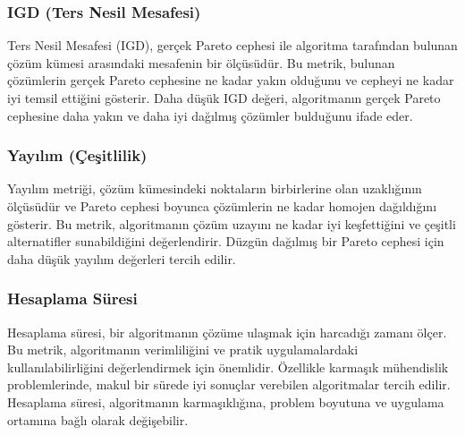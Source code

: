 \subsubsection{IGD (Ters Nesil Mesafesi)}
Ters Nesil Mesafesi (IGD), gerçek Pareto cephesi ile algoritma tarafından bulunan çözüm kümesi arasındaki mesafenin bir ölçüsüdür. Bu metrik, bulunan çözümlerin gerçek Pareto cephesine ne kadar yakın olduğunu ve cepheyi ne kadar iyi temsil ettiğini gösterir. Daha düşük IGD değeri, algoritmanın gerçek Pareto cephesine daha yakın ve daha iyi dağılmış çözümler bulduğunu ifade eder.

\subsubsection{Yayılım (Çeşitlilik)}
Yayılım metriği, çözüm kümesindeki noktaların birbirlerine olan uzaklığının ölçüsüdür ve Pareto cephesi boyunca çözümlerin ne kadar homojen dağıldığını gösterir. Bu metrik, algoritmanın çözüm uzayını ne kadar iyi keşfettiğini ve çeşitli alternatifler sunabildiğini değerlendirir. Düzgün dağılmış bir Pareto cephesi için daha düşük yayılım değerleri tercih edilir.

\subsubsection{Hesaplama Süresi}
Hesaplama süresi, bir algoritmanın çözüme ulaşmak için harcadığı zamanı ölçer. Bu metrik, algoritmanın verimliliğini ve pratik uygulamalardaki kullanılabilirliğini değerlendirmek için önemlidir. Özellikle karmaşık mühendislik problemlerinde, makul bir sürede iyi sonuçlar verebilen algoritmalar tercih edilir. Hesaplama süresi, algoritmanın karmaşıklığına, problem boyutuna ve uygulama ortamına bağlı olarak değişebilir. 